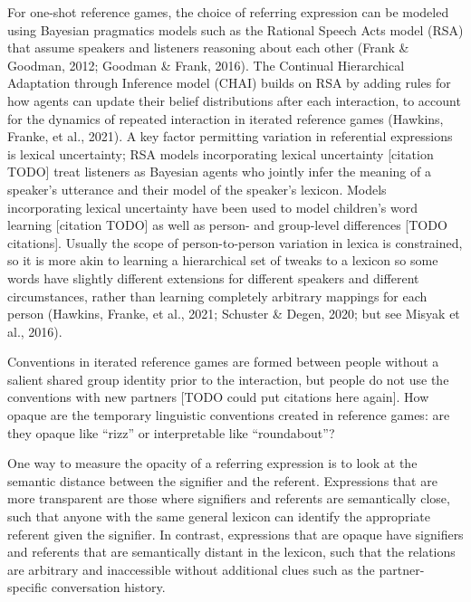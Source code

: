 \documentclass[10pt, letterpaper]{article}
\begin{document}
For one-shot reference games, the choice of referring expression can be
modeled using Bayesian pragmatics models such as the Rational Speech
Acts model (RSA) that assume speakers and listeners reasoning about each
other (Frank \& Goodman, 2012; Goodman \& Frank, 2016). The Continual
Hierarchical Adaptation through Inference model (CHAI) builds on RSA by
adding rules for how agents can update their belief distributions after
each interaction, to account for the dynamics of repeated interaction in
iterated reference games (Hawkins, Franke, et al., 2021). A key factor
permitting variation in referential expressions is lexical uncertainty;
RSA models incorporating lexical uncertainty {[}citation TODO{]} treat
listeners as Bayesian agents who jointly infer the meaning of a
speaker's utterance and their model of the speaker's lexicon. Models
incorporating lexical uncertainty have been used to model children's
word learning {[}citation TODO{]} as well as person- and group-level
differences {[}TODO citations{]}. Usually the scope of person-to-person
variation in lexica is constrained, so it is more akin to learning a
hierarchical set of tweaks to a lexicon so some words have slightly
different extensions for different speakers and different circumstances,
rather than learning completely arbitrary mappings for each person
(Hawkins, Franke, et al., 2021; Schuster \& Degen, 2020; but see Misyak
et al., 2016).

Conventions in iterated reference games are formed between people
without a salient shared group identity prior to the interaction, but
people do not use the conventions with new partners {[}TODO could put
citations here again{]}. How opaque are the temporary linguistic
conventions created in reference games: are they opaque like ``rizz'' or
interpretable like ``roundabout''?

One way to measure the opacity of a referring expression is to look at
the semantic distance between the signifier and the referent.
Expressions that are more transparent are those where signifiers and
referents are semantically close, such that anyone with the same general
lexicon can identify the appropriate referent given the signifier. In
contrast, expressions that are opaque have signifiers and referents that
are semantically distant in the lexicon, such that the relations are
arbitrary and inaccessible without additional clues such as the
partner-specific conversation history.
\end{document}

